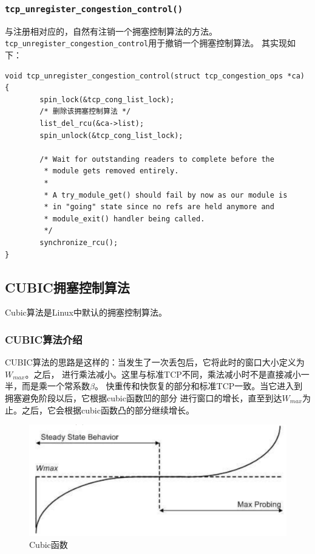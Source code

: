 \subsubsection{\texttt{tcp_unregister_congestion_control()}}
与注册相对应的，自然有注销一个拥塞控制算法的方法。
\texttt{tcp_unregister_congestion_control}用于撤销一个拥塞控制算法。
其实现如下：
\begin{verbatim}
void tcp_unregister_congestion_control(struct tcp_congestion_ops *ca)
{
        spin_lock(&tcp_cong_list_lock);
        /* 删除该拥塞控制算法 */
        list_del_rcu(&ca->list);
        spin_unlock(&tcp_cong_list_lock);

        /* Wait for outstanding readers to complete before the
         * module gets removed entirely.
         *
         * A try_module_get() should fail by now as our module is
         * in "going" state since no refs are held anymore and
         * module_exit() handler being called.
         */
        synchronize_rcu();
}
\end{verbatim}

\subsection{CUBIC拥塞控制算法}
Cubic算法是Linux中默认的拥塞控制算法。

\subsubsection{CUBIC算法介绍}
CUBIC算法的思路是这样的：当发生了一次丢包后，它将此时的窗口大小定义为$W_{max}$。之后，
进行乘法减小。这里与标准TCP不同，乘法减小时不是直接减小一半，而是乘一个常系数$\beta$。
快重传和快恢复的部分和标准TCP一致。当它进入到拥塞避免阶段以后，它根据cubic函数凹的部分
进行窗口的增长，直至到达$W_{max}$为止。之后，它会根据cubic函数凸的部分继续增长。

\begin{figure}[htpb]
\centering
\includegraphics[width=\textwidth]  {images/cubic.png}
\caption{Cubic函数}
\end{figure}

